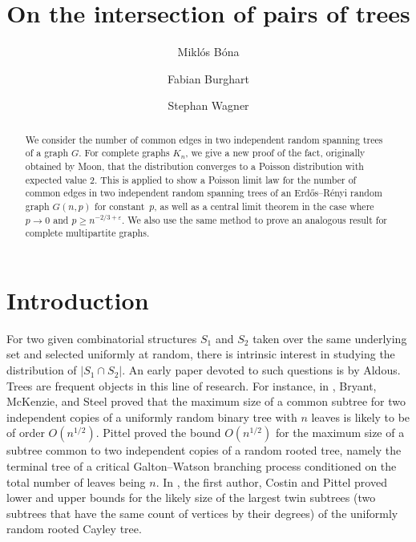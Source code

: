 \documentclass[a4paper,12pt,reqno]{amsart}
\title{On the intersection of pairs of trees}
\author[M. B\'ona]{Mikl\'os B\'ona}
\author[F. Burghart]{Fabian Burghart}
\author[S. Wagner]{Stephan Wagner}
\theoremstyle{remark}
\newcommand{\gep}{\varepsilon}
\begin{document}
\begin{abstract} We consider the number of common edges in two independent random spanning trees of a graph $G$. For complete graphs $K_n$, we give a new proof of the fact, originally obtained by Moon, that the distribution converges to a Poisson distribution with expected value $2$. This is applied to show a Poisson limit law for the number of common edges in two independent random spanning trees of an Erd\H{o}s--R\'enyi random graph $G(n,p)$ for constant~$p$, as well as a central limit theorem in the case where $p\to 0$ and $p\geq n^{-2/3+\gep}$. We also use the same method to prove an analogous result for complete multipartite graphs.
\end{abstract}

\maketitle

\section{Introduction}
For two given combinatorial structures $S_1$ and $S_2$ taken over the same underlying set and selected uniformly at random, there is intrinsic interest in studying the distribution of $|S_1\cap S_2|$. An early paper devoted to such questions is \cite{aldous} by  Aldous. Trees are frequent objects in 
this line of research. For instance, in \cite{bryant}, Bryant, McKenzie, and Steel  proved  that the maximum size of a common subtree for two independent copies of a uniformly random binary tree with $n$ leaves is likely to be of order
$O(n^{1/2})$.  Pittel \cite{pittel} proved the bound $O(n^{1/2})$ for the maximum size of a subtree common to two independent copies of a random rooted tree, namely the terminal tree of a critical Galton--Watson branching process
 conditioned on the total number of leaves being $n$. In \cite{bcp}, the first author, Costin and Pittel proved lower and upper bounds for the likely size of the largest twin subtrees (two subtrees that have the same count of vertices by their degrees) of the uniformly random rooted Cayley tree.
\end{document}
